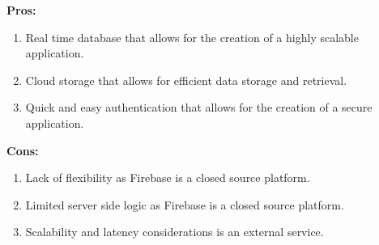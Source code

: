 \documentclass[11pt,a4paper]{article}
\begin{document}
\textbf{Pros:}
\begin{enumerate}[label*=\arabic*.]
	\item[\textbullet] Real time database that allows for the creation of a
	highly scalable application.
	\item[\textbullet] Cloud storage that allows for efficient data storage and
	retrieval.
	\item[\textbullet] Quick and easy authentication that allows for the
	creation of a secure application.
\end{enumerate}

\textbf{Cons:}
\begin{enumerate}[label*=\arabic*.]
	\item[\textbullet] Lack of flexibility as Firebase is a closed source
	platform.
	\item[\textbullet] Limited server side logic as Firebase is a closed source
	platform.
	\item[\textbullet] Scalability and latency considerations is an external
	service.
\end{enumerate}
\end{document}
